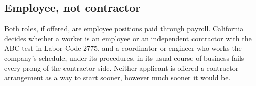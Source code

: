 \subsection{Employee, not contractor}

Both roles, if offered, are employee positions paid through payroll. California
decides whether a worker is an employee or an independent contractor with the ABC
test in Labor Code 2775, and a coordinator or engineer who works the company's
schedule, under its procedures, in its usual course of business fails every prong
of the contractor side. Neither applicant is offered a contractor arrangement as
a way to start sooner, however much sooner it would be.
